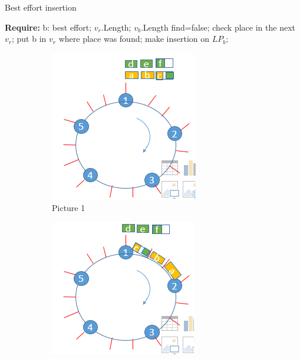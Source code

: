 \documentclass{article}
\begin{document}
\begin{algorithm}
\caption{Best effort insertion}
\begin{algorithmic}
\State \textbf{Require:} b: best effort; $v_{r}$.Length; $v_{b}$.Length
\State find=false;
\State check place in the next $v_{r}$;
\EndIf
\EndWhile
{}
\State put b in $v_{r}$ where place was found;
\Else
\State make insertion on $LP_{b}$;
\EndIf
\end{algorithmic}
\end{algorithm}
\newpage
\begin{figure}
  \begin{subfigure}[b]{0.3\textwidth}
    \includegraphics[width=\textwidth]{model31.png}
    \caption{Picture 1}
    \label{fig:1}
  \end{subfigure}
  \begin{subfigure}[b]{0.3\textwidth}
    \includegraphics[width=\textwidth]{model32.png}

\end{subfigure}
\end{figure}
\end{document}
